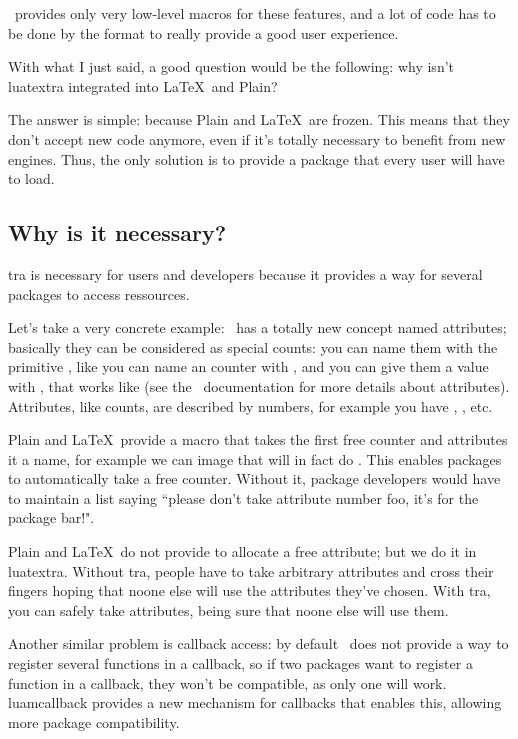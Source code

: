 \documentclass{article}
\begin{document}
\LuaTeX\ provides only very low-level macros for these features, and a lot of
code has to be done by the format to really provide a good user experience.

With what I just said, a good question would be the following: why isn't
\textsf{luatextra} integrated into \LaTeX\ and Plain?

The answer is simple: because Plain and \LaTeX\ are frozen. This means that
they don't accept new code anymore, even if it's totally necessary to benefit
from new engines. Thus, the only solution is to provide a package that every
user will have to load.

\subsection{Why is it necessary?}

\LuaTeX tra is necessary for users and developers because it provides a way
for several packages to access ressources. 

Let's take a very concrete example: \LuaTeX\ has a totally new concept named
attributes; basically they can be considered as special counts: you can name
them with the primitive \texttt{\string\attribute}, like you can name an
counter with \texttt{\string\count}, and you can give them a value with
\texttt{\string\attributedef}, that works like \texttt{\string\countdef} (see
the \LuaTeX\ documentation for more details about attributes). Attributes,
like counts, are described by numbers, for example you have
\texttt{\string{}}, \texttt{\string{}}, etc. 

Plain and \LaTeX\ provide a macro \texttt{\string\newcount} that takes the
first free counter and attributes it a name, for example we can image that
\texttt{\string\newcount\string\foo} will in fact do
\texttt{\string{}\string\foo}. This enables packages to automatically
take a free counter. Without it, package developers would have to maintain a
list saying ``please don't take attribute number foo, it's for the package
bar!".

Plain and \LaTeX\ do not provide \texttt{\string\newattribute} to allocate a
free attribute; but we do it in \textsf{luatextra}. Without \LuaTeX tra,
people have to take arbitrary attributes and cross their fingers hoping that
noone else will use the attributes they've chosen. With \LuaTeX tra, you can
safely take attributes, being sure that noone else will use them.

Another similar problem is callback access: by default \LuaTeX\ does not
provide a way to register several functions in a callback, so if two packages
want to register a function in a callback, they won't be compatible, as only
one will work. \textsf{luamcallback} provides a new mechanism for callbacks
that enables this, allowing more package compatibility.
\end{document}
